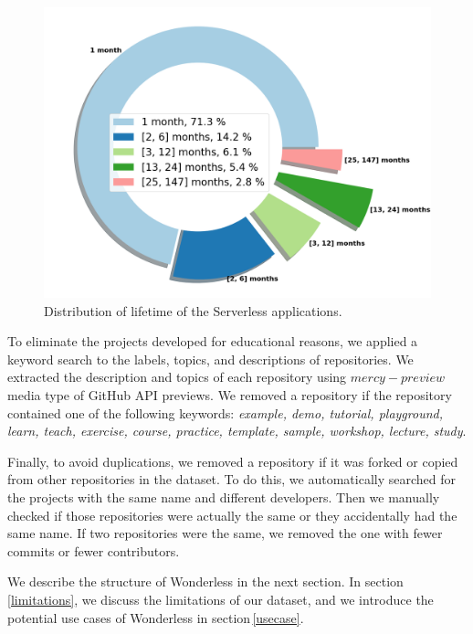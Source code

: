 \begin{figure}
	\centering
	\includegraphics[scale=0.25]{figures/lifetime}
	\caption{Distribution of lifetime of the Serverless applications.}
	\label{fig:lifetime}
\end{figure}

To eliminate the projects developed for educational reasons, 
we applied a keyword search to the labels, topics, and 
descriptions of repositories. We extracted the description 
and topics of each repository using $mercy-preview$ media 
type of GitHub API previews. We removed a repository 
if the repository contained one of the following keywords: 
\emph{example, demo, tutorial, playground, learn, teach, exercise, 
	course, practice, template, sample, workshop, lecture, study}.

Finally, to avoid duplications, we removed a repository if it was forked 
or copied from other repositories in the dataset. To do this, we automatically 
searched for the projects with the same name and different developers. 
Then we manually checked if those repositories were actually the same or 
they accidentally had the same name. If two repositories were the same, 
we removed the one with fewer commits or fewer contributors.

We describe the structure of Wonderless in the next section. 
In section\,\ref{limitations}, we discuss the limitations of our dataset, 
and we introduce the potential use cases of Wonderless in section\,\ref{usecase}.